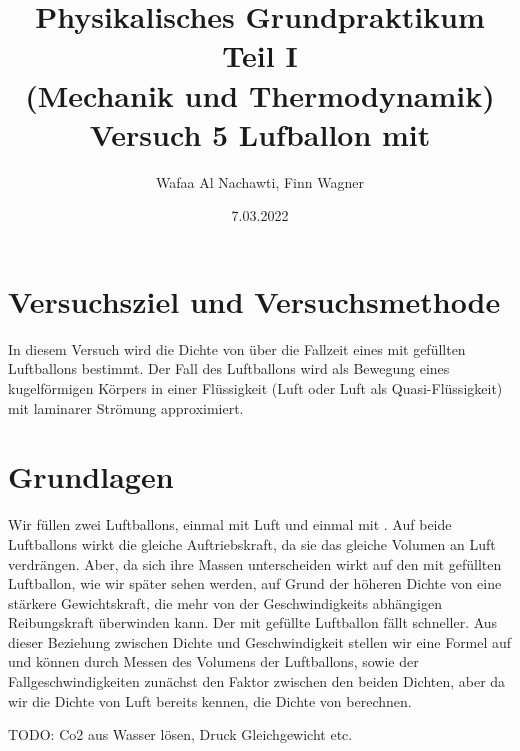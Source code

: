 \documentclass{article}
\date{7.03.2022}
\title{Physikalisches Grundpraktikum Teil I \\ (Mechanik und Thermodynamik) \\ Versuch 5 Lufballon mit \ce{CO2}}
\author{Wafaa Al Nachawti, Finn Wagner}
\begin{document}
    \maketitle

    \section{Versuchsziel und Versuchsmethode}
    In diesem Versuch wird die Dichte von  über die Fallzeit eines mit  gefüllten Luftballons bestimmt.
    Der Fall des Luftballons wird als Bewegung eines kugelförmigen Körpers in einer Flüssigkeit (Luft oder Luft als Quasi-Flüssigkeit) mit laminarer Strömung approximiert.

    \section{Grundlagen}
    Wir füllen zwei Luftballons, einmal mit Luft und einmal mit . Auf beide Luftballons wirkt die gleiche Auftriebskraft, da sie das gleiche Volumen an Luft verdrängen.
    Aber, da sich ihre Massen unterscheiden wirkt auf den mit  gefüllten Luftballon, wie wir später sehen werden, auf Grund der höheren Dichte von 
    eine stärkere Gewichtskraft, die mehr von der Geschwindigkeits abhängigen Reibungskraft überwinden kann. Der mit  gefüllte Luftballon fällt schneller.
    Aus dieser Beziehung zwischen Dichte und Geschwindigkeit stellen wir eine Formel auf und können durch Messen des Volumens der Luftballons, sowie der Fallgeschwindigkeiten
    zunächst den Faktor zwischen den beiden Dichten, aber da wir die Dichte von Luft bereits kennen\cite{Aufgabenstellung}, die Dichte von  berechnen.

    TODO: Co2 aus Wasser lösen, Druck Gleichgewicht etc.
\end{document}

